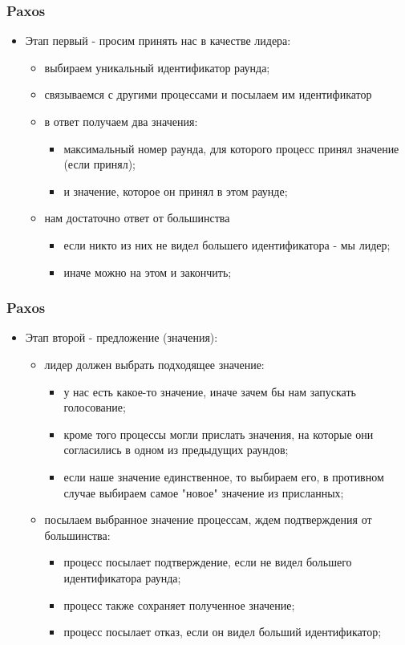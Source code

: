 \begin{frame}
\frametitle{Paxos}
\begin{itemize}
  \item Этап первый - просим принять нас в качестве лидера:
    \begin{itemize}
      \item выбираем уникальный идентификатор раунда;
      \item связываемся с другими процессами и посылаем им идентификатор
      \item в ответ получаем два значения:
        \begin{itemize}
          \item максимальный номер раунда, для которого процесс принял значение (если принял);
          \item и значение, которое он принял в этом раунде;
        \end{itemize}
      \item нам достаточно ответ от большинства
        \begin{itemize}
          \item если никто из них не видел большего идентификатора - мы лидер;
          \item иначе можно на этом и закончить;
        \end{itemize}
    \end{itemize}
\end{itemize}
\end{frame}

\begin{frame}
\frametitle{Paxos}
\begin{itemize}
  \item Этап второй - предложение (значения):
    \begin{itemize}
      \item лидер должен выбрать подходящее значение:
        \begin{itemize}
          \item у нас есть какое-то значение, иначе зачем бы нам запускать голосование;
          \item кроме того процессы могли прислать значения, на которые они согласились в одном из предыдущих раундов;
          \item если наше значение единственное, то выбираем его, в противном случае выбираем самое "новое" значение из присланных;
        \end{itemize}
      \item посылаем выбранное значение процессам, ждем подтверждения от большинства:
        \begin{itemize}
          \item процесс посылает подтверждение, если не видел большего идентификатора раунда;
          \item процесс также сохраняет полученное значение;
          \item процесс посылает отказ, если он видел больший идентификатор;
        \end{itemize}
    \end{itemize}
\end{itemize}
\end{frame}

